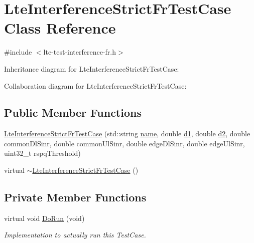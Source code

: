 \hypertarget{classLteInterferenceStrictFrTestCase}{}\section{Lte\+Interference\+Strict\+Fr\+Test\+Case Class Reference}
\label{classLteInterferenceStrictFrTestCase}


{\ttfamily \#include $<$lte-\/test-\/interference-\/fr.\+h$>$}



Inheritance diagram for Lte\+Interference\+Strict\+Fr\+Test\+Case\+:


Collaboration diagram for Lte\+Interference\+Strict\+Fr\+Test\+Case\+:
\subsection*{Public Member Functions}
\begin{DoxyCompactItemize}
\item 
\hyperlink{classLteInterferenceStrictFrTestCase_aa67e5979bb0476efe580fdddfb761af5}{Lte\+Interference\+Strict\+Fr\+Test\+Case} (std\+::string \hyperlink{generate__test__data__lte__spectrum__model_8m_ab74e6bf80237ddc4109968cedc58c151}{name}, double \hyperlink{lte__uplink__power__control_8m_a6a56223849c00f2bb062c6e55d2954df}{d1}, double \hyperlink{lte__link__budget__interference__fr_8m_a479b78c01efbe4664b402a300da492f7}{d2}, double common\+Dl\+Sinr, double common\+Ul\+Sinr, double edge\+Dl\+Sinr, double edge\+Ul\+Sinr, uint32\+\_\+t rspq\+Threshold)
\item 
virtual \hyperlink{classLteInterferenceStrictFrTestCase_ab177c6e3168465e976abb43ac735cf77}{$\sim$\+Lte\+Interference\+Strict\+Fr\+Test\+Case} ()
\end{DoxyCompactItemize}
\subsection*{Private Member Functions}
\begin{DoxyCompactItemize}
\item 
virtual void \hyperlink{classLteInterferenceStrictFrTestCase_a8c8428c04ea0f4a892f289bb8423da52}{Do\+Run} (void)
\begin{DoxyCompactList}\small\item\em Implementation to actually run this Test\+Case. \end{DoxyCompactList}\end{DoxyCompactItemize}
